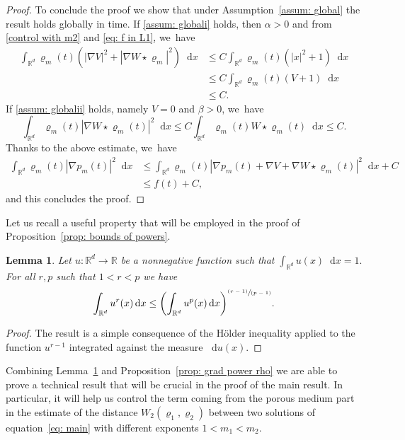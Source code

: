 \documentclass[10pt]{amsart}
\newcommand{\pspfrac}[2]{\sfrac{(#1)}{(#2)}}
\newcommand{\bbprt}[1]{\biggl(#1\biggr)}
\newcommand{\dx}[1]{\mathop{}\!\mathrm{d} #1}
\newcommand{\R}{\mathbb{R}}
\theoremstyle{plain}
\newtheorem{lemma}[theorem]{Lemma}
\theoremstyle{remark}
\begin{document}
\begin{proof}
To conclude the proof we show that under Assumption~\ref{assum: global} the result holds globally in time.
If \eqref{assum: globali} holds, then $\alpha >0$ and from \eqref{control with m2} and \eqref{eq: f in L1}, we~have
\begin{align*}
\int_{\R^d} \varrho_m(t) (|\nabla V|^2 + |\nabla W\star \varrho_m|^2) \dx x&\leq C \int_{\R^d} \varrho_m(t) (|x|^2+1)\dx x \\&\leq C \int_{\R^d} \varrho_m(t) (V+1)\dx x\\&\leq C.
\end{align*}
If \eqref{assum: globalii} holds, namely $V=0$ and $\beta > 0$, we~have
\begin{equation*}
\int_{\R^d} \varrho_m(t) |\nabla W\star \varrho_m(t)|^2 \dx x \leq C \int_{\R^d} \varrho_m(t) W\star \varrho_m(t)\dx x\leq C.
\end{equation*}
Thanks to the above estimate, we~have
\begin{align*}
\int_{\R^d} \varrho_m(t) |\nabla p_m(t)|^2 \dx x&\leq \int_{\R^d} \varrho_m(t) |\nabla p_m(t)+\nabla V +\nabla W\star \varrho_m(t)|^2 \dx x + C\\
&\leq f(t) + C,
\end{align*}
and this concludes the proof.
\end{proof}

Let us recall a useful property that will be employed in the proof of Proposition~\ref{prop: bounds of powers}.
\begin{lemma}\label{lemma}
Let $u:\R^d\to \R$ be a nonnegative function such that $\int_{\R^d} u(x)\dx x=1.$ For all $r,p$ such that $1<r<p$ we have
\begin{equation*}
\int_{\R^d} u^r(x) \dx x \leq \bbprt{\int_{\R^d}u^p(x) \dx x}^{\pspfrac{r-1}{p-1}}.
\end{equation*}
\end{lemma}
\begin{proof}
The result is a simple consequence of the Hölder inequality applied to the function $u^{r-1}$ integrated against the measure $\dx u(x)$.
\end{proof}

Combining Lemma~\ref{lemma} and Proposition~\ref{prop: grad power rho} we are able to prove a technical result that will be crucial in the proof of the main result. In particular, it will help us control the term coming from the porous medium part in the estimate of the distance $W_2(\varrho_1,\varrho_2)$ between two solutions of equation~\eqref{eq: main} with different exponents \hbox{$1<m_1< m_2$}.
\end{document}
